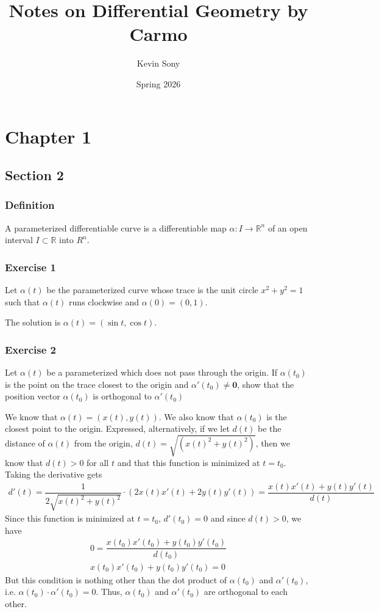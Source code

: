 \documentclass{article}
\title{Notes on Differential Geometry by Carmo}
\author{Kevin Sony}
\date{Spring 2026}
\newcommand{\R}{\mathbb{R}}
\begin{document}
	
	\maketitle
	
	\section*{Chapter 1}
	\subsection*{Section 2}
	
	\subsubsection*{Definition}
	A parameterized differentiable curve is a differentiable map $\alpha \colon I \to \R^n$ of an open interval $I \subset \R$ into $R^n$. 
	
	\subsubsection*{Exercise 1}
	Let $\alpha(t)$ be the parameterized curve whose trace is the unit circle $x^2 + y^2 = 1$ such that $\alpha(t)$ runs clockwise and $\alpha(0) = (0, 1)$.
	
	The solution is $\alpha(t) = (\sin t, \cos t)$.
	
	\subsubsection*{Exercise 2}
	Let $\alpha(t)$ be a parameterized which does not pass through the origin. If $\alpha(t_0)$ is the point on the trace closest to the origin and $\alpha'(t_0) \neq \mathbf{0}$, show that the position vector $\alpha(t_0)$ is orthogonal to $\alpha'(t_0)$
	
	We know that $\alpha(t) = (x(t), y(t))$. We also know that $\alpha(t_0)$ is the closest point to the origin. Expressed, alternatively, if we let $d(t)$ be the distance of $\alpha(t)$ from the origin, $d(t) = \sqrt{(x(t)^2 + y(t)^2)}$, then we know that $d(t) > 0$ for all $t$ and that this function is minimized at $t = t_0$. Taking the derivative gets
	\begin{gather*}
		d'(t) = \dfrac{1}{2 \sqrt{ x(t)^2 + y(t)^2 }} \cdot \left( 2x(t)x'(t) + 2y(t)y'(t) \right) = \dfrac{x(t)x'(t) + y(t)y'(t)}{d(t)}
	\end{gather*}
	Since this function is minimized at $t = t_0$, $d'(t_0) = 0$ and since $d(t) > 0$, we have
	\begin{gather*}
		0 = \dfrac{x(t_0)x'(t_0) + y(t_0)y'(t_0)}{d(t_0)} \\
		x(t_0)x'(t_0) + y(t_0)y'(t_0) = 0
	\end{gather*}
	But this condition is nothing other than the dot product of $\alpha(t_0)$ and $\alpha'(t_0)$, i.e. $\alpha(t_0) \cdot \alpha'(t_0) = 0$. Thus, $\alpha(t_0)$ and $\alpha'(t_0)$ are orthogonal to each other.
\end{document}
